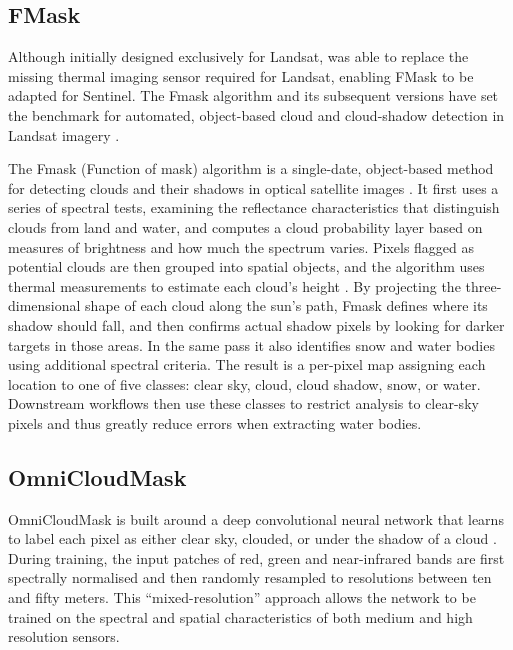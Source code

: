 \subsection{FMask}
Although initially designed exclusively for Landsat, \cite{frantz_haß_uhl_stoffels_hill_2018} was able to replace the missing thermal imaging sensor required for Landsat, enabling FMask to be adapted for Sentinel. The Fmask algorithm and its subsequent versions have set the benchmark for automated, object-based cloud and cloud-shadow detection in Landsat imagery \citep{qiu_zhu_he_2019}. 

The Fmask (Function of mask) algorithm is a single-date, object-based method for detecting clouds and their shadows in optical satellite images \citep{tarrio_tang_masek_claverie_ju_qiu_zhu_woodcock_2020}. It first uses a series of spectral tests, examining the reflectance characteristics that distinguish clouds from land and water, and computes a cloud probability layer based on measures of brightness and how much the spectrum varies. Pixels flagged as potential clouds are then grouped into spatial objects, and the algorithm uses thermal measurements to estimate each cloud’s height \citep{zhu_helmer_2018}. By projecting the three-dimensional shape of each cloud along the sun’s path, Fmask defines where its shadow should fall, and then confirms actual shadow pixels by looking for darker targets in those areas. In the same pass it also identifies snow and water bodies using additional spectral criteria. The result is a per-pixel map assigning each location to one of five classes: clear sky, cloud, cloud shadow, snow, or water. Downstream workflows then use these classes to restrict analysis to clear-sky pixels and thus greatly reduce errors when extracting water bodies. 

\subsection{OmniCloudMask}
OmniCloudMask is built around a deep convolutional neural network that learns to label each pixel as either clear sky, clouded, or under the shadow of a cloud \citep{wright_duncan_nik_thompson_george_2024}. During training, the input patches of red, green and near-infrared bands are first spectrally normalised and then randomly resampled to resolutions between ten and fifty meters. This “mixed-resolution” approach allows the network to be trained on the spectral and spatial characteristics of both medium and high resolution sensors. 

